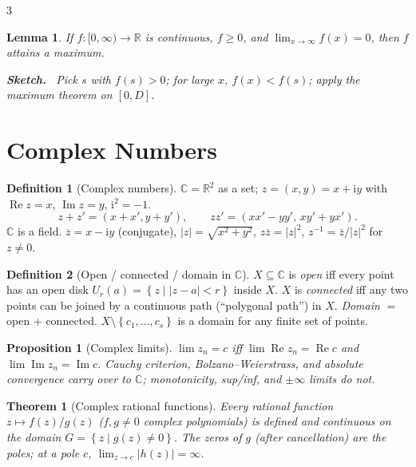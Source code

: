 \documentclass[10pt,a4paper,landscape]{article}
\theoremstyle{definition}
\newtheorem{defn}{Definition}[section]
\theoremstyle{plain}
\newtheorem{thm}{Theorem}[section]
\newtheorem{lem}{Lemma}[section]
\newtheorem{prop}{Proposition}[section]
\theoremstyle{remark}
\newcommand{\R}{\mathbb{R}}
\newcommand{\C}{\mathbb{C}}
\newcommand{\im}{\operatorname{Im}}
\newcommand{\re}{\operatorname{Re}}
\newcommand{\abs}[1]{\lvert #1 \rvert}
\newcommand{\set}[1]{\left\{ #1 \right\}}
\newcommand{\oo}{\infty}
\newcommand{\ball}[1]{U_{#1}}
\newenvironment{proofsketch}{%
  \par\small\color{exgray}\textbf{Sketch.}\ }%
  {\par}
\begin{document}
\begin{multicols*}{3}
\begin{lem}
If $f: [0,\oo) \to \R$ is continuous, $f \ge 0$, and $\lim_{x \to \oo} f(x) = 0$, then $f$ attains a maximum.
\begin{proofsketch}
Pick $s$ with $f(s) > 0$; for large $x$, $f(x) < f(s)$; apply the maximum theorem on $[0, D]$.
\end{proofsketch}
\end{lem}
\section{Complex Numbers}

\begin{defn}[Complex numbers]
$\C = \R^2$ as a set; $z = (x,y) = x + \mathrm{i} y$ with $\re z = x$, $\im z = y$, $\mathrm{i}^2 = -1$.
\[
z + z' = (x+x', y+y'),\qquad z z' = (xx' - yy',\, xy' + yx').
\]
$\C$ is a field. $\overline{z} = x - \mathrm{i} y$ (conjugate), $\abs{z} = \sqrt{x^2 + y^2}$, $z \overline{z} = \abs{z}^2$, $z^{-1} = \overline{z}/\abs{z}^2$ for $z \neq 0$.
\end{defn}

\begin{defn}[Open / connected / domain in $\C$]
$X \subseteq \C$ is \emph{open} iff every point has an open disk $\ball{r}(a) = \set{z \mid \abs{z-a} < r}$ inside $X$. $X$ is \emph{connected} iff any two points can be joined by a continuous path (``polygonal path'') in $X$. \emph{Domain} $=$ open + connected. $X \setminus \set{c_1,\dots,c_s}$ is a domain for any finite set of points.
\end{defn}

\begin{prop}[Complex limits]
$\lim z_n = c$ iff $\lim \re z_n = \re c$ and $\lim \im z_n = \im c$. Cauchy criterion, Bolzano--Weierstrass, and absolute convergence carry over to $\C$; monotonicity, sup/inf, and $\pm\oo$ limits do not.
\end{prop}

\begin{thm}[Complex rational functions]
Every rational function $z \mapsto f(z)/g(z)$ ($f, g \neq 0$ complex polynomials) is defined and continuous on the domain $G = \set{z \mid g(z) \neq 0}$. The zeros of $g$ (after cancellation) are the \emph{poles}; at a pole $c$, $\lim_{z \to c} \abs{h(z)} = \oo$.
\end{thm}


\end{multicols*}
\end{document}

